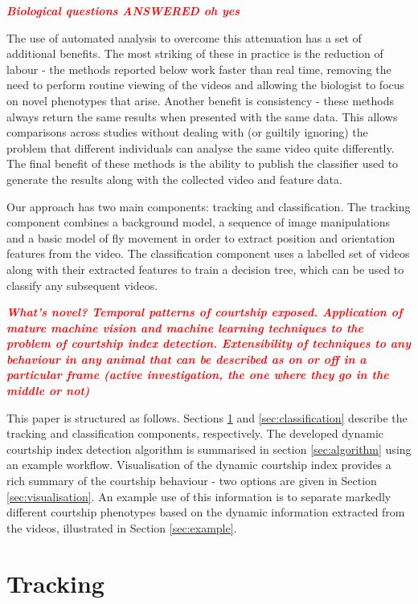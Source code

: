 \documentclass{article}
\newcommand{\todo}[1]{\textsf{\emph{\textbf{\textcolor{red}{#1}}}}}
\begin{document}
\todo{Biological questions ANSWERED oh yes}

The use of automated analysis to overcome this attenuation has a set of additional benefits. The most striking of these in practice is the reduction of labour - the methods reported below work faster than real time, removing the need to perform routine viewing of the videos and allowing the biologist to focus on novel phenotypes that arise. Another benefit is consistency - these methods always return the same results when presented with the same data. This allows comparisons across studies without dealing with (or guiltily ignoring) the problem that different individuals can analyse the same video quite differently. The final benefit of these methods is the ability to publish the classifier used to generate the results along with the collected video and feature data.

Our approach has two main components: tracking and classification. The tracking component combines a background model, a sequence of image manipulations and a basic model of fly movement in order to extract position and orientation features from the video. The classification component uses a labelled set of videos along with their extracted features to train a decision tree, which can be used to classify any subsequent videos. 

\todo{What's novel? Temporal patterns of courtship exposed. Application of mature machine vision and machine learning techniques to the problem of courtship index detection. Extensibility of techniques to any behaviour in any animal that can be described as on or off in a particular frame (active investigation, the one where they go in the middle or not)}

This paper is structured as follows. Sections \ref{sec:tracking} and \ref{sec:classification} describe the tracking and classification components, respectively. The developed dynamic courtship index detection algorithm is summarised in section \ref{sec:algorithm} using an example workflow. Visualisation of the dynamic courtship index provides a rich summary of the courtship behaviour - two options are given in Section \ref{sec:visualisation}. An example use of this information is to separate markedly different courtship phenotypes based on the dynamic information extracted from the videos, illustrated in Section \ref{sec:example}.

\section{Tracking}
\label{sec:tracking}
\end{document}
